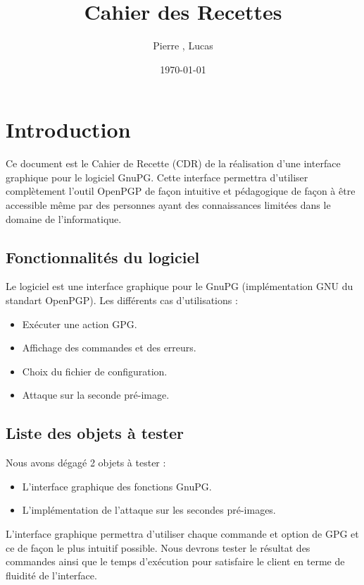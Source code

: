 \documentclass{../res/univ-projet}
\title{Cahier des Recettes}
\author{Pierre \bsc{Balmelle}, Lucas \bsc{Barbay}}
\date{\today}
\begin{document}
\maketitle
\newpage
\tableofcontents
\newpage

\section{Introduction}

Ce document est le Cahier de Recette (CDR) de la réalisation d'une interface graphique pour le logiciel GnuPG.
Cette interface permettra d'utiliser complètement l'outil OpenPGP de façon intuitive et pédagogique de façon 
à être accessible même par des personnes ayant des connaissances limitées dans le domaine de l'informatique. 

\subsection{Fonctionnalités du logiciel}
Le logiciel est une interface graphique pour le GnuPG (implémentation GNU du standart OpenPGP).
Les différents cas d'utilisations :
\begin{itemize}
 \item Exécuter une action GPG.
 \item Affichage des commandes et des erreurs.
 \item Choix du fichier de configuration.
 \item Attaque sur la seconde pré-image.
\end{itemize}

\subsection{Liste des objets à tester}
Nous avons dégagé 2 objets à tester : 
\begin{itemize}
 \item L'interface graphique des fonctions GnuPG.
 \item L'implémentation de l'attaque sur les secondes pré-images. 
\end{itemize}

L'interface graphique permettra d'utiliser chaque commande et option de GPG et ce de façon le plus intuitif possible. Nous
devrons tester le résultat des commandes ainsi que le temps d'exécution pour satisfaire le client en terme de fluidité de l'interface.
\end{document}
